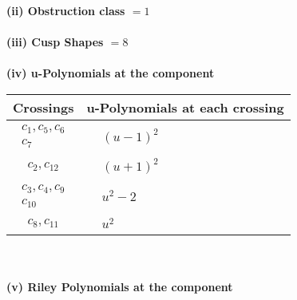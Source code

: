 \documentclass[1p]{elsarticle_modified}
\theoremstyle{definition}
\begin{document}
\flushleft \textbf{(ii) Obstruction class $= 1$}\\~\\
\flushleft \textbf{(iii) Cusp Shapes $= 8$}\\~\\
\newpage\renewcommand{\arraystretch}{1}
\flushleft \textbf{(iv) u-Polynomials at the component}\newline \\
\begin{tabular}{m{50pt}|m{274pt}}
Crossings & \hspace{64pt}u-Polynomials at each crossing \\
\hline $$\begin{aligned}c_{1},c_{5},c_{6}\\c_{7}\end{aligned}$$&$\begin{aligned}
&(u-1)^2
\end{aligned}$\\
\hline $$\begin{aligned}c_{2},c_{12}\end{aligned}$$&$\begin{aligned}
&(u+1)^2
\end{aligned}$\\
\hline $$\begin{aligned}c_{3},c_{4},c_{9}\\c_{10}\end{aligned}$$&$\begin{aligned}
&u^2-2
\end{aligned}$\\
\hline $$\begin{aligned}c_{8},c_{11}\end{aligned}$$&$\begin{aligned}
&u^2
\end{aligned}$\\
\hline
\end{tabular}\\~\\
\newpage\renewcommand{\arraystretch}{1}
\flushleft \textbf{(v) Riley Polynomials at the component}\newline \\
\end{document}
